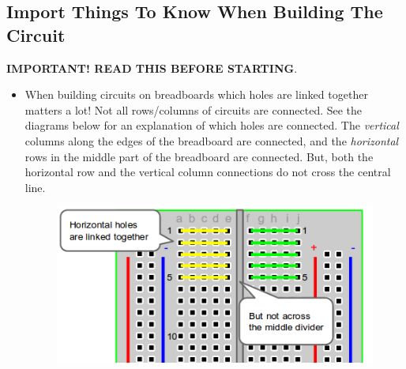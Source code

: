 \documentclass[11pt]{article}
\begin{document}
\subsection{Import Things To Know When Building The Circuit}
{\bf IMPORTANT! READ THIS BEFORE STARTING}.

\begin{itemize}
\item {When building circuits on breadboards which holes are linked together matters a lot!
    Not all rows/columns of circuits are connected. See the diagrams below for an
    explanation of which holes are connected. The \emph{vertical} columns along the edges
    of the breadboard are connected, and the \emph{horizontal} rows in the middle part of
    the breadboard are connected. But, both the horizontal row and the vertical column
    connections do not cross the central line.

    \begin{figure}[H]
      \centering
      \includegraphics[width=\textwidth]{figures/breadboard-connectivity1.png}
      \caption{\label{fig:breadboard-connectivity1}}
    \end{figure}

}
\end{itemize}
\end{document}
